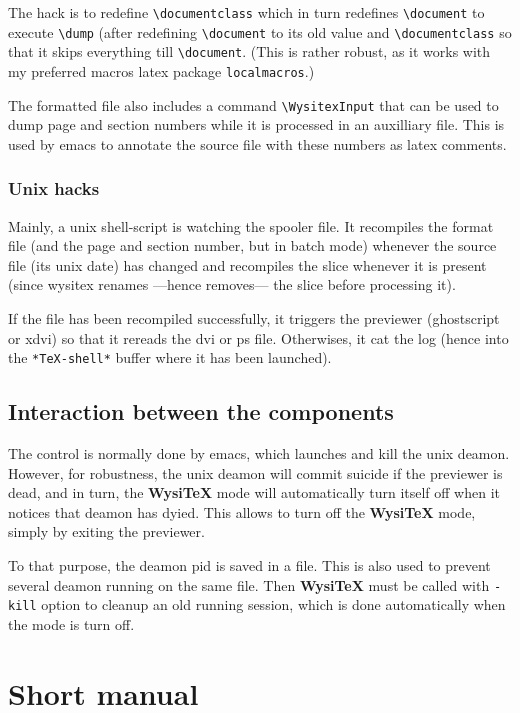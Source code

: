 \documentclass{article}
\let \lst \verb
\def \wysitex{\textbf {WysiTeX}}
\begin{document}
The hack is to redefine \lst"\documentclass" which in turn  redefines
\lst"\document" to execute \lst"\dump" (after redefining \lst"\document"
to its old value and \lst"\documentclass" so that it skips everything till
\lst"\document". (This is rather robust, as it works with my preferred macros
latex package \lst"localmacros".)

The formatted file also includes a command \lst"\WysitexInput" that can be
used to dump page and section numbers while it is processed in an auxilliary
file. This is used by emacs to annotate the source file with these numbers
as latex comments. 

\subsubsection* {Unix hacks}

Mainly, a unix shell-script is watching the spooler file.  It recompiles the
format file (and the page and section number, but in batch mode) whenever
the source file (its unix date) has changed  and 
recompiles the slice whenever it is present (since wysitex renames ---hence
removes--- the slice before processing it).

If the file has been recompiled successfully, it triggers the previewer
(ghostscript or xdvi) so that it rereads the dvi or ps file. Otherwises, it
cat the log (hence into the \lst"*TeX-shell*" buffer where it has been
launched). 


\subsection {Interaction between the components}%

The control is normally done by emacs, which launches and kill the unix
deamon. However, for robustness, the unix deamon will commit suicide if the
previewer is dead, and in turn, the {\wysitex} mode will automatically turn
itself off when it notices that deamon has dyied. This allows to turn off
the {\wysitex} mode, simply by exiting the previewer. 

To that purpose, the deamon pid is saved in a file. 
This is also used to prevent several deamon running on the same file. 
Then {\wysitex} must be called with \lst"-kill" option to cleanup an  old
running session, which is done automatically when the mode is turn off.


\section {Short manual}%
\end{document}
